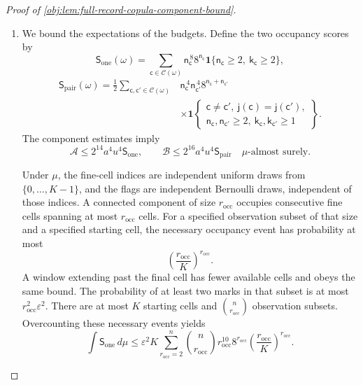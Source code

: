 \begin{proof}[Proof of \cref{obj:lem:full-record-copula-component-bound}]
\begin{enumerate}
\item
We bound the expectations of the budgets. Define the two occupancy scores by
\[
\mathsf S_{\mathrm{one}}(\omega)
 =
 \sum_{\mathsf c\in\mathscr C(\omega)}
 \mathsf n_{\mathsf c}^{\,8}8^{\mathsf n_{\mathsf c}}
 \mathbf1\{\mathsf n_{\mathsf c}\ge2,\
           \mathsf k_{\mathsf c}\ge2\},
\]
\[
\begin{aligned}
\mathsf S_{\mathrm{pair}}(\omega)
 =\frac12
 \sum_{\mathsf c,\mathsf c'\in\mathscr C(\omega)}
 &\mathsf n_{\mathsf c}^{\,4}\mathsf n_{\mathsf c'}^{\,4}
   8^{\mathsf n_{\mathsf c}+\mathsf n_{\mathsf c'}}\\
 &\times
 \mathbf1\left\{
 \begin{array}{c}
 \mathsf c\ne\mathsf c',\
 \mathsf j(\mathsf c)=\mathsf j(\mathsf c'),\\
 \mathsf n_{\mathsf c},\mathsf n_{\mathsf c'}\ge2,\
 \mathsf k_{\mathsf c},\mathsf k_{\mathsf c'}\ge1
 \end{array}\right\}.
\end{aligned}
\]
The component estimates imply
\[
\mathcal A\le2^{14}a^4u^4\mathsf S_{\mathrm{one}},
\qquad
\mathcal B\le2^{16}a^4u^4\mathsf S_{\mathrm{pair}}
\quad\mu\text{-almost surely}.
\]

Under \(\mu\), the fine-cell indices are independent uniform draws from
\(\{0,\ldots,K-1\}\), and the flags are independent Bernoulli draws, independent of those indices. A connected component of size \(r_{\mathrm{occ}}\) occupies consecutive fine cells spanning at most \(r_{\mathrm{occ}}\) cells. For a specified observation subset of that size and a specified starting cell, the necessary occupancy event has probability at most
\[
\left(\frac{r_{\mathrm{occ}}}{K}\right)^{r_{\mathrm{occ}}}.
\]
A window extending past the final cell has fewer available cells and obeys the same bound. The probability of at least two marks in that subset is at most
\(r_{\mathrm{occ}}^2\varepsilon^2\). There are at most \(K\) starting cells and
\(\binom n{r_{\mathrm{occ}}}\) observation subsets. Overcounting these necessary events yields
\[
\int\mathsf S_{\mathrm{one}}\,d\mu
 \le
 \varepsilon^2K
 \sum_{r_{\mathrm{occ}}=2}^{n}
 \binom n{r_{\mathrm{occ}}}
 r_{\mathrm{occ}}^{10}8^{r_{\mathrm{occ}}}
 \left(\frac{r_{\mathrm{occ}}}{K}\right)^{r_{\mathrm{occ}}}.
\]


\end{enumerate}
\end{proof}
